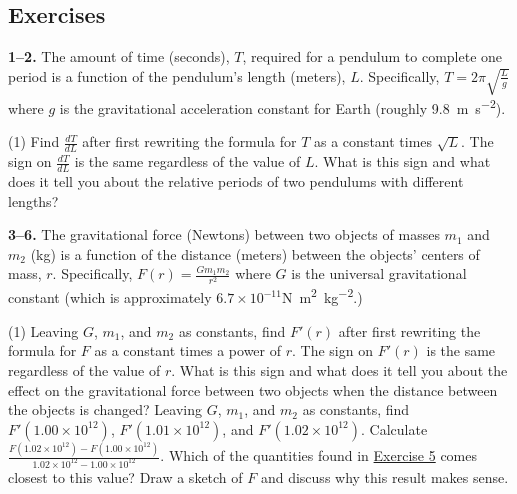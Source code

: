 \documentclass[10pt,oneside,]{book}
\theoremstyle{plain}
\theoremstyle{definition}
\numberwithin{equation}{section}
\newcommand{\fe}[2]{#1\mathopen{}\left(#2\right)\mathclose{}}
\newcommand{\fd}[1]{#1'}
\newcommand{\lz}[2]{\frac{d#1}{d#2}}
\begin{document}
\subsection[Exercises]{Exercises}\label{exercises-41}
\textbf{1--2. }\hypertarget{exercisegroup-82}{\null}The amount of time (seconds), \(T\), required for a pendulum to complete one period is a function of the pendulum's length (meters), \(L\).  Specifically, \(T=2\pi\sqrt{\frac{L}{g}}\) where \(g\) is the gravitational acceleration constant for Earth (roughly \SI{9.8}{\meter\per\second\tothe{2}}).%
\par
\begin{exercisegroup}(1)
\exercise[1.]\hypertarget{exercise-396}{\null}Find \(\lz{T}{L}\) after first rewriting the formula for \(T\) as a constant times \(\sqrt{L}\).%
\exercise[2.]\hypertarget{exercise-397}{\null}The sign on \(\lz{T}{L}\) is the same regardless of the value of \(L\).  What is this sign and what does it tell you about the relative periods of two pendulums with different lengths?%
\end{exercisegroup}
\par\smallskip\noindent
\textbf{3--6. }\hypertarget{exercisegroup-83}{\null}The gravitational force (Newtons) between two objects of masses \(m_1\) and \(m_2\) (\si{\kilo\gram}) is a function of the distance (meters) between the objects' centers of mass, \(r\).    Specifically, \(\fe{F}{r}=\frac{Gm_1m_2}{r^2}\) where \(G\) is the universal gravitational constant (which is approximately \(6.7\times10^{-11}\)\si{\newton\meter\tothe{2}\per\kilo\gram\tothe{2}}.)%
\par
\begin{exercisegroup}(1)
\exercise[3.]\hypertarget{exercise-398}{\null}Leaving \(G\), \(m_1\), and \(m_2\) as constants, find \(\fe{\fd{F}}{r}\) after first rewriting the formula for \(F\) as a constant times a power of \(r\).%
\exercise[4.]\hypertarget{exercise-399}{\null}The sign on \(\fe{\fd{F}}{r}\) is the same regardless of the value of \(r\).  What is this sign and what does it tell you about the effect on the gravitational force between two objects when the distance between the objects is changed?%
\exercise[5.]\hypertarget{exercise-evaluate-gravity}{\null}Leaving \(G\), \(m_1\), and \(m_2\) as constants, find \(\fe{\fd{F}}{1.00\times10^{12}}\), \(\fe{\fd{F}}{1.01\times10^{12}}\), and \(\fe{\fd{F}}{1.02\times10^{12}}\).%
\exercise[6.]\hypertarget{exercise-401}{\null}Calculate \(\frac{\fe{F}{1.02\times10^{12}}-\fe{F}{1.00\times10^{12}}}{1.02\times10^{12}-1.00\times10^{12}}\). Which of the quantities found in \hyperlink{exercise-evaluate-gravity}{Exercise 5} comes closest to this value?  Draw a sketch of \(F\) and discuss why this result makes sense.%
\end{exercisegroup}
\par\smallskip\noindent
\typeout{************************************************}
\typeout{************************************************}
\end{document}
